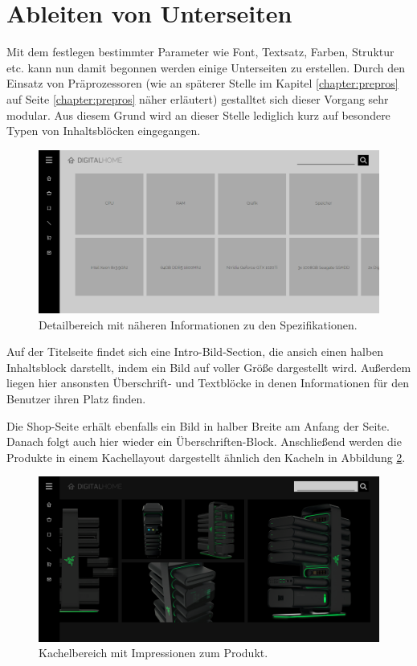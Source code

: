 \section{Ableiten von Unterseiten}
Mit dem festlegen bestimmter Parameter wie Font, Textsatz, Farben, Struktur etc. kann nun damit begonnen werden einige Unterseiten zu erstellen. Durch den Einsatz von Präprozessoren (wie an späterer Stelle im Kapitel \ref{chapter:prepros} auf Seite \ref{chapter:prepros} näher erläutert) gestalltet sich dieser Vorgang sehr modular. Aus diesem Grund wird an dieser Stelle lediglich kurz auf besondere Typen von Inhaltsblöcken eingegangen.

\begin{figure} [h]
	\includegraphics[width=\textwidth]{./img/unters_details.png}
	\caption{Detailbereich mit näheren Informationen zu den Spezifikationen.}
	\label{unters:details}
\end{figure}

Auf der Titelseite findet sich eine Intro-Bild-Section, die ansich einen halben Inhaltsblock darstellt, indem ein Bild auf voller Größe dargestellt wird. Außerdem liegen hier ansonsten Überschrift- und Textblöcke in denen Informationen für den Benutzer ihren Platz finden.

Die Shop-Seite erhält ebenfalls ein Bild in halber Breite am Anfang der Seite. Danach folgt auch hier wieder ein Überschriften-Block. Anschließend werden die Produkte in einem Kachellayout dargestellt ähnlich den Kacheln in Abbildung \ref{unters:impress}.

\begin{figure} [h]
	\includegraphics[width=\textwidth]{./img/unters_impress.png}
	\caption{Kachelbereich mit Impressionen zum Produkt.}
	\label{unters:impress}
\end{figure}

